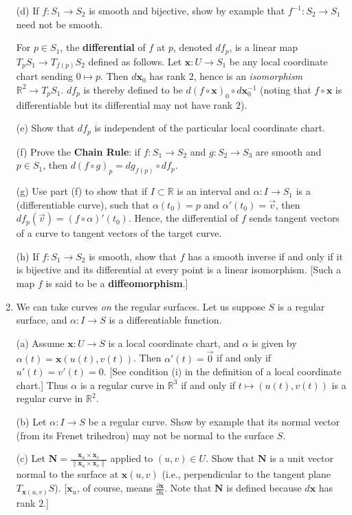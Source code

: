 \documentclass[leqno]{book}
\begin{document}
\begin{enumerate}
(d) If $f:S_1\to S_2$ is smooth and bijective, show by example that $f^{-1}:S_2\to S_1$ need not be smooth.

For $p\in S_1$, the \textbf{differential} of $f$ at $p$, denoted $df_p$, is a linear map $T_pS_1\to T_{f(p)}S_2$ defined as follows.  Let $\mathbf x:U\to S_1$ be any local coordinate chart sending $0\mapsto p$.  Then $d\mathbf x_0$ has rank $2$, hence is an \emph{isomorphism} $\mathbb R^2\to T_pS_1$.  $df_p$ is thereby defined to be $d(f\circ\mathbf x)_0\circ d\mathbf x_0^{-1}$ (noting that $f\circ\mathbf x$ is differentiable but its differential may not have rank $2$).

(e) Show that $df_p$ is independent of the particular local coordinate chart.

(f) Prove the \textbf{Chain Rule}: if $f:S_1\to S_2$ and $g:S_2\to S_3$ are smooth and $p\in S_1$, then $d(f\circ g)_p=dg_{f(p)}\circ df_p$.

(g) Use part (f) to show that if $I\subset\mathbb R$ is an interval and $\alpha:I\to S_1$ is a (differentiable curve), such that $\alpha(t_0)=p$ and $\alpha'(t_0)=\vec v$, then $df_p(\vec v)=(f\circ\alpha)'(t_0)$.  Hence, the differential of $f$ sends tangent vectors of a curve to tangent vectors of the target curve.

(h) If $f:S_1\to S_2$ is smooth, show that $f$ has a smooth inverse if and only if it is bijective and its differential at every point is a linear isomorphism.  [Such a map $f$ is said to be a \textbf{diffeomorphism}.]

\item We can take curves \emph{on} the regular surfaces.  Let us suppose $S$ is a regular surface, and $\alpha:I\to S$ is a differentiable function.

(a) Assume $\mathbf x:U\to S$ is a local coordinate chart, and $\alpha$ is given by $\alpha(t)=\mathbf x(u(t),v(t))$.  Then $\alpha'(t)=\vec 0$ if and only if $u'(t)=v'(t)=0$.  [See condition (i) in the definition of a local coordinate chart.]  Thus $\alpha$ is a regular curve in $\mathbb R^3$ if and only if $t\mapsto(u(t),v(t))$ is a regular curve in $\mathbb R^2$.

(b) Let $\alpha:I\to S$ be a regular curve.  Show by example that its normal vector (from its Frenet trihedron) may not be normal to the surface $S$.

(c) Let $\mathbf N=\frac{\mathbf x_u\times\mathbf x_v}{\|\mathbf x_u\times\mathbf x_v\|}$ applied to $(u,v)\in U$.  Show that $\mathbf N$ is a unit vector normal to the surface at $\mathbf x(u,v)$ (i.e., perpendicular to the tangent plane $T_{\mathbf x(u,v)}S$).  [$\mathbf x_u$, of course, means $\frac{\partial\mathbf x}{\partial u}$.  Note that $\mathbf N$ is defined because $d\mathbf x$ has rank $2$.]


\end{enumerate}
\end{document}
